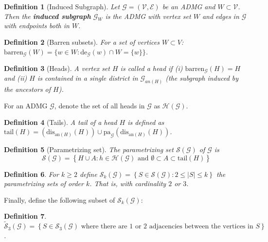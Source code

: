 \documentclass[a4paper]{article}
\newtheorem{definition}{Definition}
\begin{document}
\begin{definition}[Induced Subgraph] Let $\mathcal{G} = (\mathcal{V},\mathcal{E})$ be an ADMG and $W \subset \mathcal{V}$. Then the \textbf{induced subgraph} $\mathcal{G}_W$ is the ADMG with vertex set $W$ and edges in $\mathcal{G}$ with endpoints both in $W$.
\end{definition}

\begin{definition}[Barren subsets]For a set of vertices $W \subset V$:  $\text{barren}_\mathcal{G}(W) = \{w \in W : \text{de}_\mathcal{G}(w) \cap W = \{w\}\}$.
\end{definition}
	
\begin{definition}[Heads]A vertex set $H$ is called a \textit{head} if (i) $\text{barren}_\mathcal{G}(H) = H$ and (ii) $H$ is contained in a single district in $\mathcal{G}_{an(H)}$ (the subgraph induced by the ancestors of $H$).
\end{definition}
	
For an ADMG $\mathcal{G}$, denote the set of all heads in $\mathcal{G}$ as $\mathcal{H}(\mathcal{G})$.
 
\begin{definition}[Tails]A tail of a head $H$ is defined as $\text{tail}(H) = (\text{dis}_{\text{an}(H)}(H)) \cup \text{pa}_{\mathcal{G}}(\text{dis}_{\text{an}(H)}(H))$.
\end{definition}

\begin{definition}[Parametrizing set]The \textit{parametrizing set $\mathcal{S(G)}$ of $\mathcal{G}$} is $$\mathcal{S(G)} = \left\{ H \cup A : h \in \mathcal{H(G)} \text{ and } \emptyset \subset A \subset \text{tail}(H) \right\} $$
\end{definition}

\begin{definition}For $k \geq 2$ define $\mathcal{S}_k(\mathcal{G}) = \left\{ S \in \mathcal{S(\mathcal{G})} : 2 \leq |S| \leq k \right\}$ the parametrizing sets of order $k$. That is, with cardinality $2$ or $3$.
\end{definition}

Finally, define the following subset of $\mathcal{S}_k(\mathcal{G})$:

\begin{definition}
 $\mathcal{\tilde{S}}_3(\mathcal{G}) = \left\{ S \in \mathcal{S}_3(\mathcal{G}) \text{ where there are $1$ or $2$ adjacencies between the vertices in } S \right\}$.
\end{definition}
\end{document}

